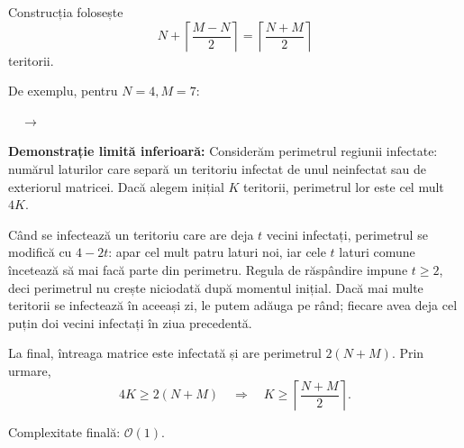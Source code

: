 Construcția folosește
\[
    N+\left\lceil\frac{M-N}{2}\right\rceil
    =\left\lceil\frac{N+M}{2}\right\rceil
\]
teritorii.

De exemplu, pentru $N = 4, M = 7$:

\begin{center}
    \(\quad\longrightarrow\quad\)
\end{center}

\textbf{Demonstrație limită inferioară:} Considerăm perimetrul regiunii infectate: numărul laturilor care separă un teritoriu infectat de unul neinfectat sau de exteriorul matricei. Dacă alegem inițial $K$ teritorii, perimetrul lor este cel mult $4K$.

Când se infectează un teritoriu care are deja $t$ vecini infectați, perimetrul se modifică cu $4-2t$: apar cel mult patru laturi noi, iar cele $t$ laturi comune încetează să mai facă parte din perimetru. Regula de răspândire impune $t\geq 2$, deci perimetrul nu crește niciodată după momentul inițial. Dacă mai multe teritorii se infectează în aceeași zi, le putem adăuga pe rând; fiecare avea deja cel puțin doi vecini infectați în ziua precedentă.

La final, întreaga matrice este infectată și are perimetrul $2(N+M)$. Prin urmare,
\[
    4K \geq 2(N+M)
    \quad\Longrightarrow\quad
    K \geq \left\lceil\frac{N+M}{2}\right\rceil.
\]


Complexitate finală: $\mathcal{O}(1)$.
